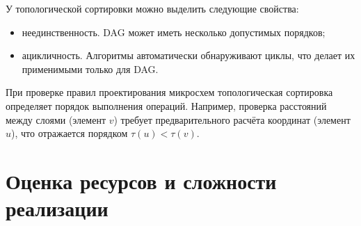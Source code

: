 У топологической сортировки можно выделить следующие свойства:

\begin{itemize}
    \item неединственность.
		DAG может иметь несколько допустимых порядков;
    \item ацикличность.
		Алгоритмы автоматически обнаруживают циклы,
		что делает их применимыми только для DAG.
\end{itemize}

При проверке правил проектирования микросхем топологическая
сортировка определяет порядок выполнения операций.
Например, проверка расстояний между слоями (элемент \( v \))
требует предварительного расчёта координат (элемент \( u \)),
что отражается порядком \( \tau(u) < \tau(v) \).

\section{Оценка ресурсов и сложности реализации}

